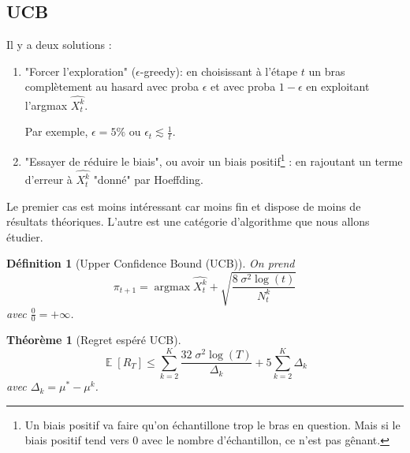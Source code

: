 \documentclass{article}
\DeclareMathOperator*{\argmax}{argmax}
\DeclareMathOperator*{\E}{\mathbb{E}}
\newtheorem{definition}{Définition}[section]
\newtheorem{theorem}{Théorème}[section]
\theoremstyle{remark}
\theoremstyle{remark}
\begin{document}
\subsection{UCB}

Il y a deux solutions :
\begin{enumerate}
   \item "Forcer l'exploration" ($\epsilon$-greedy): en choisissant à l'étape $t$ un bras complètement au hasard avec proba $\epsilon$ et avec proba $1-\epsilon$ en exploitant l'argmax $\widehat{X_t^k}$.

   Par exemple, $\epsilon = 5\%$ ou $\epsilon_t \lesssim \frac{1}{t}$.
   \item "Essayer de réduire le biais", ou avoir un biais positif\footnote{Un biais positif va faire qu'on échantillone trop le bras en question. Mais si le biais positif tend vers 0 avec le nombre d'échantillon, ce n'est pas gênant.} : en rajoutant un terme d'erreur à $\widehat{X_t^k}$ "donné" par Hoeffding.
\end{enumerate}

Le premier cas est moins intéressant car moins fin et dispose de moins de résultats théoriques. L'autre est une catégorie d'algorithme  que nous allons étudier.

\begin{definition}[Upper Confidence Bound (UCB)]
   On prend
   $$
   \pi_{t+1} = \argmax \widehat{X_t^k} + \sqrt{\frac{8 \; \sigma^2 \log(t)}{N_t^k}}
   $$
   avec $\frac{0}{0} = +\infty$.
\end{definition}

\begin{theorem}[Regret espéré UCB]
   $$
   \E[R_T] \leq \sum_{k=2}^K \frac{32 \;\sigma^2 \log(T)}{\Delta_k} + 5 \sum_{k=2}^K \Delta_k
   $$
   avec $\Delta_k = \mu^* - \mu^k$.
\end{theorem}
\end{document}
